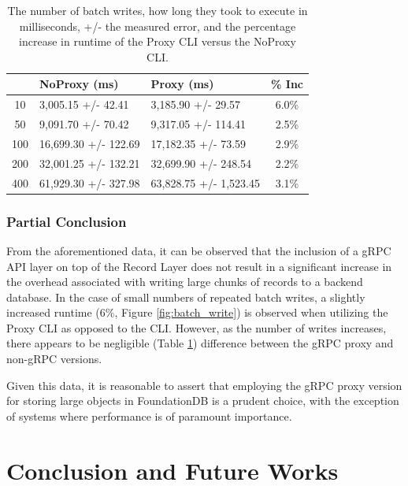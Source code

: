 \documentclass[sigconf]{acmart}
\begin{document}
\begin{table}[h]
\begin{tabular}{|c|l|l|c|}
    \hline
    \rowcolor[HTML]{656565} 
    \multicolumn{1}{|c}{\cellcolor[HTML]{656565}{\color[HTML]{FFFFFF} \textbf{N}}} &
    {\color[HTML]{FFFFFF} \textbf{NoProxy (ms)}} &
    {\color[HTML]{FFFFFF} \textbf{Proxy (ms)}} &
    {\color[HTML]{FFFFFF} \textbf{\% Inc}} \\ \hline
    10  & 3,005.15 +/- 42.41   & 3,185.90 +/- 29.57     & 6.0\% \\
    \rowcolor[HTML]{EFEFEF} 
    50  & 9,091.70 +/- 70.42   & 9,317.05 +/- 114.41    & 2.5\% \\
    100 & 16,699.30 +/- 122.69 & 17,182.35 +/- 73.59    & 2.9\% \\
    \rowcolor[HTML]{EFEFEF} 
    200 & 32,001.25 +/- 132.21 & 32,699.90 +/- 248.54   & 2.2\% \\
    400 & 61,929.30 +/- 327.98 & 63,828.75 +/- 1,523.45 & 3.1\% \\ \hline
\end{tabular}
\caption{The number of batch writes, how long they took to execute in milliseconds, +/- the measured error, and the percentage increase in runtime of the Proxy CLI versus the NoProxy CLI.}
\label{tab:batch_write}
\end{table}

\subsubsection{Partial Conclusion}

From the aforementioned data, it can be observed that the inclusion of a gRPC API layer on top of the Record Layer does not result in a significant increase in the overhead associated with writing large chunks of records to a backend database. In the case of small numbers of repeated batch writes, a slightly increased runtime (6\%, Figure \ref{fig:batch_write}) is observed when utilizing the Proxy CLI as opposed to the CLI. However, as the number of writes increases, there appears to be negligible (Table \ref{tab:batch_write}) difference between the gRPC proxy and non-gRPC versions.

Given this data, it is reasonable to assert that employing the gRPC proxy version for storing large objects in FoundationDB is a prudent choice, with the exception of systems where performance is of paramount importance.

\section{Conclusion and Future Works}
\end{document}
